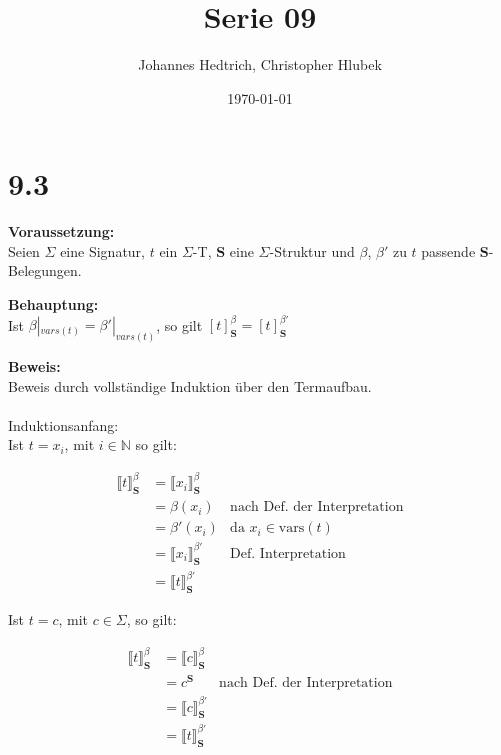 \documentclass[12pt,a4paper]{scrartcl}
\title{Serie 09}
\author{Johannes Hedtrich, Christopher Hlubek}
\date{\today}
\begin{document}
  \section*{9.3}
  \noindent
  \textbf{Voraussetzung:}\\
  
  Seien $\Sigma$ eine Signatur, $t$ ein $\Sigma$-T, $\textbf{S}$ eine $\Sigma$-Struktur und $\beta$, $\beta'$ zu $t$ passende $\textbf{S}$-Belegungen.

  \noindent
  \textbf{Behauptung:}\\ 
  
  Ist $\beta|_{vars(t)} = \beta'|_{vars(t)}$, so gilt $[t]^{\beta}_{\textbf{S}} = [t]^{\beta'}_{\textbf{S}}$

  \noindent
  \textbf{Beweis:}\\
  
  Beweis durch vollständige Induktion über den Termaufbau.\\
  \\
  Induktionsanfang:\\
  Ist $t = x_i$, mit $i \in \mathbb{N}$ so gilt:
  
  \begin{align*}
  \llbracket t \rrbracket^{\beta}_{\textbf{S}} &= \llbracket x_i \rrbracket^{\beta}_{\textbf{S}}\\
                                               &= \beta(x_i) &\text{nach Def. der Interpretation}\\
                                               &= \beta'(x_i) &\text{da $x_i \in \text{vars}(t)$}\\
                                               &= \llbracket x_i \rrbracket^{\beta'}_{\textbf{S}} &\text{Def. Interpretation}\\
                                               &= \llbracket t \rrbracket^{\beta'}_{\textbf{S}}
  \end{align*}
  
  
  Ist $t = c$, mit $c \in \Sigma$, so gilt:
  
  \begin{align*}  
  \llbracket t \rrbracket^{\beta}_{\textbf{S}} &= \llbracket c \rrbracket^{\beta}_{\textbf{S}}\\
                                                &= c^{\textbf{S}} & \text{nach Def. der Interpretation}\\
                                                &= \llbracket c \rrbracket^{\beta'}_{\textbf{S}}\\
                                                &= \llbracket t \rrbracket^{\beta'}_{\textbf{S}}
  \end{align*}
  
\end{document}
